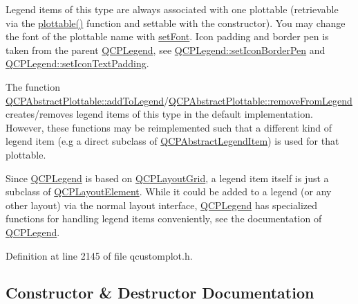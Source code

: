 Legend items of this type are always associated with one plottable (retrievable via the \hyperlink{class_q_c_p_plottable_legend_item_af29e9a2c60b4cba0cac2447b8af7b488}{plottable()} function and settable with the constructor). You may change the font of the plottable name with \hyperlink{class_q_c_p_abstract_legend_item_a409c53455d8112f71d70c0c43eb10265}{set\+Font}. Icon padding and border pen is taken from the parent \hyperlink{class_q_c_p_legend}{Q\+C\+P\+Legend}, see \hyperlink{class_q_c_p_legend_a2f2c93d18a651f4ff294bb3f026f49b8}{Q\+C\+P\+Legend\+::set\+Icon\+Border\+Pen} and \hyperlink{class_q_c_p_legend_a62973bd69d5155e8ea3141366e8968f6}{Q\+C\+P\+Legend\+::set\+Icon\+Text\+Padding}.

The function \hyperlink{class_q_c_p_abstract_plottable_a70f8cabfd808f7d5204b9f18c45c13f5}{Q\+C\+P\+Abstract\+Plottable\+::add\+To\+Legend}/\hyperlink{class_q_c_p_abstract_plottable_aa1f350e510326d012b9a9c9249736c83}{Q\+C\+P\+Abstract\+Plottable\+::remove\+From\+Legend} creates/removes legend items of this type in the default implementation. However, these functions may be reimplemented such that a different kind of legend item (e.\+g a direct subclass of \hyperlink{class_q_c_p_abstract_legend_item}{Q\+C\+P\+Abstract\+Legend\+Item}) is used for that plottable.

Since \hyperlink{class_q_c_p_legend}{Q\+C\+P\+Legend} is based on \hyperlink{class_q_c_p_layout_grid}{Q\+C\+P\+Layout\+Grid}, a legend item itself is just a subclass of \hyperlink{class_q_c_p_layout_element}{Q\+C\+P\+Layout\+Element}. While it could be added to a legend (or any other layout) via the normal layout interface, \hyperlink{class_q_c_p_legend}{Q\+C\+P\+Legend} has specialized functions for handling legend items conveniently, see the documentation of \hyperlink{class_q_c_p_legend}{Q\+C\+P\+Legend}. 

Definition at line 2145 of file qcustomplot.\+h.



\subsection{Constructor \& Destructor Documentation}
\hypertarget{class_q_c_p_plottable_legend_item_ac1072591fe409d3dabad51b23ee4d6c5}{}
